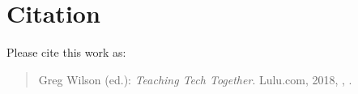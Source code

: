 \chapter{Citation}\label{s:citation}

Please cite this work as:

\begin{quote}
Greg Wilson (ed.): \emph{Teaching Tech Together}.  Lulu.com, 2018,
{\isbn}, {\website}.
\end{quote}
